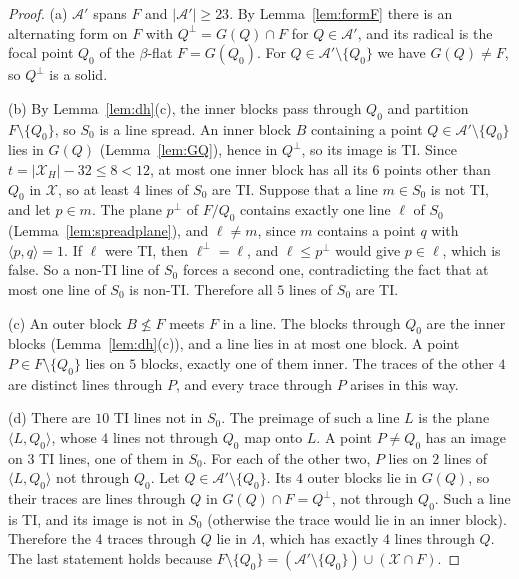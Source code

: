 \documentclass[11pt]{amsart}
\theoremstyle{definition}
\newcommand{\X}{\mathcal{X}}
\newcommand{\A}{\mathcal{A}}
\begin{document}
\begin{proof}
(a) $\A'$ spans $F$ and $|\A'|\ge23$. By Lemma~\ref{lem:formF} there is an alternating form on $F$ with $Q^\perp=G(Q)\cap F$ for $Q\in\A'$, and its radical is the focal point $Q_0$ of the $\beta$-flat $F=G(Q_0)$. For $Q\in\A'\setminus\{Q_0\}$ we have $G(Q)\ne F$, so $Q^\perp$ is a solid.

(b) By Lemma~\ref{lem:dh}(c), the inner blocks pass through $Q_0$ and partition $F\setminus\{Q_0\}$, so $S_0$ is a line spread. An inner block $B$ containing a point $Q\in\A'\setminus\{Q_0\}$ lies in $G(Q)$ (Lemma~\ref{lem:GQ}), hence in $Q^\perp$, so its image is TI. Since $t=|\X_H|-32\le8<12$, at most one inner block has all its $6$ points other than $Q_0$ in $\X$, so at least $4$ lines of $S_0$ are TI. Suppose that a line $m\in S_0$ is not TI, and let $p\in m$. The plane $p^\perp$ of $F/Q_0$ contains exactly one line $\ell$ of $S_0$ (Lemma~\ref{lem:spreadplane}), and $\ell\ne m$, since $m$ contains a point $q$ with $\langle p,q\rangle=1$. If $\ell$ were TI, then $\ell^\perp=\ell$, and $\ell\le p^\perp$ would give $p\in\ell$, which is false. So a non-TI line of $S_0$ forces a second one, contradicting the fact that at most one line of $S_0$ is non-TI. Therefore all $5$ lines of $S_0$ are TI.

(c) An outer block $B\not\le F$ meets $F$ in a line. The blocks through $Q_0$ are the inner blocks (Lemma~\ref{lem:dh}(c)), and a line lies in at most one block. A point $P\in F\setminus\{Q_0\}$ lies on $5$ blocks, exactly one of them inner. The traces of the other $4$ are distinct lines through $P$, and every trace through $P$ arises in this way.

(d) There are $10$ TI lines not in $S_0$. The preimage of such a line $L$ is the plane $\langle L,Q_0\rangle$, whose $4$ lines not through $Q_0$ map onto $L$. A point $P\ne Q_0$ has an image on $3$ TI lines, one of them in $S_0$. For each of the other two, $P$ lies on $2$ lines of $\langle L,Q_0\rangle$ not through $Q_0$. Let $Q\in\A'\setminus\{Q_0\}$. Its $4$ outer blocks lie in $G(Q)$, so their traces are lines through $Q$ in $G(Q)\cap F=Q^\perp$, not through $Q_0$. Such a line is TI, and its image is not in $S_0$ (otherwise the trace would lie in an inner block). Therefore the $4$ traces through $Q$ lie in $\Lambda$, which has exactly $4$ lines through $Q$. The last statement holds because $F\setminus\{Q_0\}=(\A'\setminus\{Q_0\})\cup(\X\cap F)$.
\end{proof}
\end{document}
